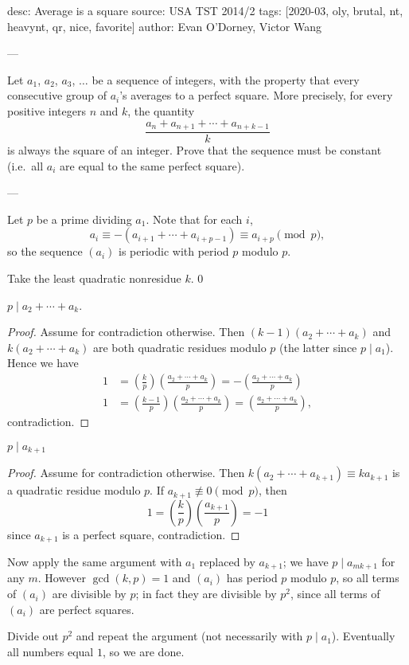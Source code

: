 desc: Average is a square
source: USA TST 2014/2
tags: [2020-03, oly, brutal, nt, heavynt, qr, nice, favorite]
author: Evan O'Dorney, Victor Wang

---

Let $a_1$, $a_2$, $a_3$, $\ldots$ be a sequence of integers, with the property that every consecutive group of $a_i$'s averages to a perfect square. More precisely, for every positive integers $n$ and $k$, the quantity \[\frac{a_n+a_{n+1}+\cdots+a_{n+k-1}}k\]
is always the square of an integer. Prove that the sequence must be constant (i.e.\ all $a_i$ are equal to the same perfect square).

---

Let $p$ be a prime dividing $a_1$. Note that for each $i$, \[a_i\equiv-(a_{i+1}+\cdots+a_{i+p-1})\equiv a_{i+p}\pmod p,\]
so the sequence $(a_i)$ is periodic with period $p$ modulo $p$.

Take the least quadratic nonresidue $k$.
\setcounter{claim}0
\begin{claim}
    $p\mid a_2+\cdots+a_k$.
\end{claim}
\begin{proof}
    Assume for contradiction otherwise. Then $(k-1)(a_2+\cdots+a_k)$ and $k(a_2+\cdots+a_k)$ are both quadratic residues modulo $p$ (the latter since $p\mid a_1$). Hence we have
    \begin{align*}
        1&=\left(\frac kp\right)\left(\frac{a_2+\cdots+a_k}p\right)=-\left(\frac{a_2+\cdots+a_k}p\right)\\
        1&=\left(\frac{k-1}p\right)\left(\frac{a_2+\cdots+a_k}p\right)=\left(\frac{a_2+\cdots+a_k}p\right),
    \end{align*}
    contradiction.
\end{proof}
\begin{claim}
    $p\mid a_{k+1}$
\end{claim}
\begin{proof}
    Assume for contradiction otherwise. Then $k(a_2+\cdots+a_{k+1})\equiv ka_{k+1}$ is a quadratic residue modulo $p$. If $a_{k+1}\not\equiv0\pmod p$, then \[1=\left(\frac kp\right)\left(\frac{a_{k+1}}p\right)=-1\]
    since $a_{k+1}$ is a perfect square, contradiction.
\end{proof}

Now apply the same argument with $a_1$ replaced by $a_{k+1}$; we have $p\mid a_{mk+1}$ for any $m$. However $\gcd(k,p)=1$ and $(a_i)$ has period $p$ modulo $p$, so all terms of $(a_i)$ are divisible by $p$; in fact they are divisible by $p^2$, since all terms of $(a_i)$ are perfect squares.

Divide out $p^2$ and repeat the argument (not necessarily with $p\mid a_1$). Eventually all numbers equal $1$, so we are done.
